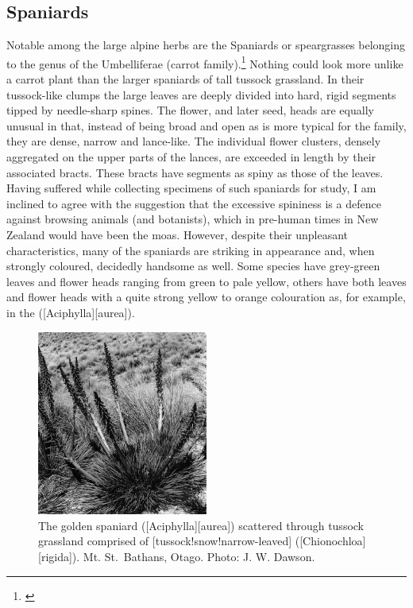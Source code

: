 \subsection{Spaniards}

Notable among the large alpine herbs are the Spaniards or speargrasses belonging to the genus  of the Umbelliferae (carrot family).\footnote{\cite{dawson1978research}}
Nothing could look more unlike a carrot plant than the larger spaniards of tall tussock grassland.
In their tussock-like clumps the large leaves are deeply divided into hard, rigid segments tipped by needle-sharp spines.
The flower, and later seed, heads are equally unusual in that, instead of being broad and open as is more typical for the family, they are dense, narrow and lance-like.
The individual flower clusters, densely aggregated on the upper parts of the lances, are exceeded in length by their associated bracts.
These bracts have segments as spiny as those of the leaves.
Having suffered while collecting specimens of such spaniards for study, I am inclined to agree with the suggestion that the excessive spininess is a defence against browsing animals (and botanists), which in pre-human times in New Zealand would have been the moas.
However, despite their unpleasant characteristics, many of the spaniards are striking in appearance and, when strongly coloured, decidedly handsome as well.
Some species have grey-green leaves and flower heads ranging from green to pale yellow, others have both leaves and flower heads with a quite strong yellow to orange colouration as, for example, in the  ([Aciphylla][aurea]).

\begin{figure}
	\includegraphics[width=0.5\textwidth]{graphics/figure98golden-spaniard.jpg}
	\centering
	\caption[The golden spaniard]{The golden spaniard ([Aciphylla][aurea]) scattered through tussock grassland comprised of [tussock!snow!narrow-leaved] ([Chionochloa][rigida]). Mt. St.\ Bathans, Otago.
	Photo: J. W. Dawson.}%
	\label{fig:98golden-spaniard}
\end{figure}

